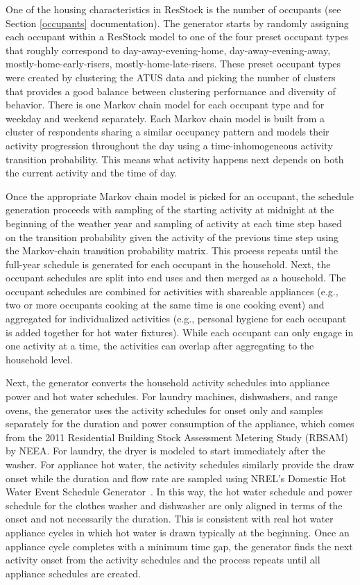 One of the housing characteristics in ResStock is the number of occupants (see Section \ref{occupants} documentation). The generator starts by randomly assigning each occupant within a ResStock model to one of the four preset occupant types that roughly correspond to day-away-evening-home, day-away-evening-away, mostly-home-early-risers, mostly-home-late-risers. These preset occupant types were created by clustering the ATUS data and picking the number of clusters that provides a good balance between clustering performance and diversity of behavior. There is one Markov chain model for each occupant type and for weekday and weekend separately. Each Markov chain model is built from a cluster of respondents sharing a similar occupancy pattern and models their activity progression throughout the day using a time-inhomogeneous activity transition probability. This means what activity happens next depends on both the current activity and the time of day. 

Once the appropriate Markov chain model is picked for an occupant, the schedule generation proceeds with sampling of the starting activity at midnight at the beginning of the weather year and sampling of activity at each time step based on the transition probability given the activity of the previous time step using the Markov-chain transition probability matrix. This process repeats until the full-year schedule is generated for each occupant in the household. Next, the occupant schedules are split into end uses and then merged as a household. The occupant schedules are combined for activities with shareable appliances (e.g., two or more occupants cooking at the same time is one cooking event) and aggregated for individualized activities (e.g., personal hygiene for each occupant is added together for hot water fixtures). While each occupant can only engage in one activity at a time, the activities can overlap after aggregating to the household level. 

Next, the generator converts the household activity schedules into appliance power and hot water schedules. For laundry machines, dishwashers, and range ovens, the generator uses the activity schedules for onset only and samples separately for the duration and power consumption of the appliance, which comes from the 2011 Residential Building Stock Assessment Metering Study (RBSAM) by NEEA. For laundry, the dryer is modeled to start immediately after the washer. For appliance hot water, the activity schedules similarly provide the draw onset while the duration and flow rate are sampled using NREL's Domestic Hot Water Event Schedule Generator~\citep{Hendron2010}. In this way, the hot water schedule and power schedule for the clothes washer and dishwasher are only aligned in terms of the onset and not necessarily the duration. This is consistent with real hot water appliance cycles in which hot water is drawn typically at the beginning. Once an appliance cycle completes with a minimum time gap, the generator finds the next activity onset from the activity schedules and the process repeats until all appliance schedules are created. 

